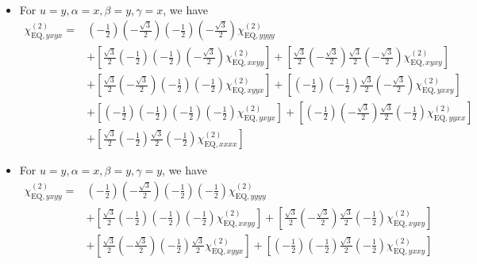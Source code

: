 \documentclass[UTF8,10pt,a4paper]{article}
\begin{document}
\begin{itemize}
\begin{align}
&
\end{align}\normalsize
\item For $u=y,\alpha=x,\beta=y,\gamma=x$, we have
\footnotesize\begin{align}
\nonumber\chi_{\text{EQ},yxyx}^{(2)}=&\left(-\frac{1}{2}\right)\left(-\frac{\sqrt{3}}{2}\right)\left(-\frac{1}{2}\right)\left(-\frac{\sqrt{3}}{2}\right)\chi_{\text{EQ},yyyy}^{(2)}\\
\nonumber&+\left[\frac{\sqrt{3}}{2}\left(-\frac{1}{2}\right)\left(-\frac{1}{2}\right)\left(-\frac{\sqrt{3}}{2}\right)\chi_{\text{EQ},xxyy}^{(2)}\right]+\left[\frac{\sqrt{3}}{2}\left(-\frac{\sqrt{3}}{2}\right)\frac{\sqrt{3}}{2}\left(-\frac{\sqrt{3}}{2}\right)\chi_{\text{EQ},xyxy}^{(2)}\right]\\
\nonumber&+\left[\frac{\sqrt{3}}{2}\left(-\frac{\sqrt{3}}{2}\right)\left(-\frac{1}{2}\right)\left(-\frac{1}{2}\right)\chi_{\text{EQ},xyyx}^{(2)}\right]+\left[\left(-\frac{1}{2}\right)\left(-\frac{1}{2}\right)\frac{\sqrt{3}}{2}\left(-\frac{\sqrt{3}}{2}\right)\chi_{\text{EQ},yxxy}^{(2)}\right]\\
\nonumber&+\left[\left(-\frac{1}{2}\right)\left(-\frac{1}{2}\right)\left(-\frac{1}{2}\right)\left(-\frac{1}{2}\right)\chi_{\text{EQ},yxyx}^{(2)}\right]+\left[\left(-\frac{1}{2}\right)\left(-\frac{\sqrt{3}}{2}\right)\frac{\sqrt{3}}{2}\left(-\frac{1}{2}\right)\chi_{\text{EQ},yyxx}^{(2)}\right]\\
&+\left[\frac{\sqrt{3}}{2}\left(-\frac{1}{2}\right)\frac{\sqrt{3}}{2}\left(-\frac{1}{2}\right)\chi_{\text{EQ},xxxx}^{(2)}\right]
\end{align}\normalsize
\item For $u=y,\alpha=x,\beta=y,\gamma=y$, we have
\footnotesize\begin{align}
\nonumber\chi_{\text{EQ},yxyy}^{(2)}=&\left(-\frac{1}{2}\right)\left(-\frac{\sqrt{3}}{2}\right)\left(-\frac{1}{2}\right)\left(-\frac{1}{2}\right)\chi_{\text{EQ},yyyy}^{(2)}\\
\nonumber&+\left[\frac{\sqrt{3}}{2}\left(-\frac{1}{2}\right)\left(-\frac{1}{2}\right)\left(-\frac{1}{2}\right)\chi_{\text{EQ},xxyy}^{(2)}\right]+\left[\frac{\sqrt{3}}{2}\left(-\frac{\sqrt{3}}{2}\right)\frac{\sqrt{3}}{2}\left(-\frac{1}{2}\right)\chi_{\text{EQ},xyxy}^{(2)}\right]\\
\nonumber&+\left[\frac{\sqrt{3}}{2}\left(-\frac{\sqrt{3}}{2}\right)\left(-\frac{1}{2}\right)\frac{\sqrt{3}}{2}\chi_{\text{EQ},xyyx}^{(2)}\right]+\left[\left(-\frac{1}{2}\right)\left(-\frac{1}{2}\right)\frac{\sqrt{3}}{2}\left(-\frac{1}{2}\right)\chi_{\text{EQ},yxxy}^{(2)}\right]\\

\end{align}
\end{itemize}
\end{document}
